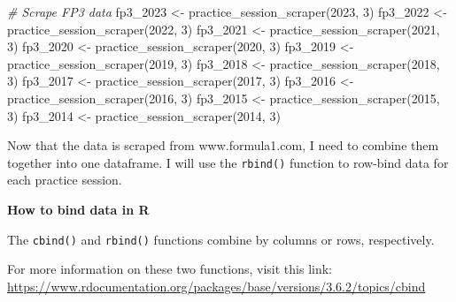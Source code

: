 \documentclass[
]{book}
\newenvironment{Shaded}{\begin{snugshade}}{\end{snugshade}}
\newcommand{\CommentTok}[1]{\textcolor[rgb]{0.56,0.35,0.01}{\textit{#1}}}
\newcommand{\DecValTok}[1]{\textcolor[rgb]{0.00,0.00,0.81}{#1}}
\newcommand{\FunctionTok}[1]{\textcolor[rgb]{0.00,0.00,0.00}{#1}}
\newcommand{\NormalTok}[1]{#1}
\newcommand{\OtherTok}[1]{\textcolor[rgb]{0.56,0.35,0.01}{#1}}
\begin{document}
\begin{Shaded}
\begin{Highlighting}[]
\CommentTok{\# Scrape FP3 data}
\NormalTok{fp3\_2023 }\OtherTok{\textless{}{-}} \FunctionTok{practice\_session\_scraper}\NormalTok{(}\DecValTok{2023}\NormalTok{, }\DecValTok{3}\NormalTok{)}
\NormalTok{fp3\_2022 }\OtherTok{\textless{}{-}} \FunctionTok{practice\_session\_scraper}\NormalTok{(}\DecValTok{2022}\NormalTok{, }\DecValTok{3}\NormalTok{)}
\NormalTok{fp3\_2021 }\OtherTok{\textless{}{-}} \FunctionTok{practice\_session\_scraper}\NormalTok{(}\DecValTok{2021}\NormalTok{, }\DecValTok{3}\NormalTok{)}
\NormalTok{fp3\_2020 }\OtherTok{\textless{}{-}} \FunctionTok{practice\_session\_scraper}\NormalTok{(}\DecValTok{2020}\NormalTok{, }\DecValTok{3}\NormalTok{)}
\NormalTok{fp3\_2019 }\OtherTok{\textless{}{-}} \FunctionTok{practice\_session\_scraper}\NormalTok{(}\DecValTok{2019}\NormalTok{, }\DecValTok{3}\NormalTok{)}
\NormalTok{fp3\_2018 }\OtherTok{\textless{}{-}} \FunctionTok{practice\_session\_scraper}\NormalTok{(}\DecValTok{2018}\NormalTok{, }\DecValTok{3}\NormalTok{)}
\NormalTok{fp3\_2017 }\OtherTok{\textless{}{-}} \FunctionTok{practice\_session\_scraper}\NormalTok{(}\DecValTok{2017}\NormalTok{, }\DecValTok{3}\NormalTok{)}
\NormalTok{fp3\_2016 }\OtherTok{\textless{}{-}} \FunctionTok{practice\_session\_scraper}\NormalTok{(}\DecValTok{2016}\NormalTok{, }\DecValTok{3}\NormalTok{)}
\NormalTok{fp3\_2015 }\OtherTok{\textless{}{-}} \FunctionTok{practice\_session\_scraper}\NormalTok{(}\DecValTok{2015}\NormalTok{, }\DecValTok{3}\NormalTok{)}
\NormalTok{fp3\_2014 }\OtherTok{\textless{}{-}} \FunctionTok{practice\_session\_scraper}\NormalTok{(}\DecValTok{2014}\NormalTok{, }\DecValTok{3}\NormalTok{)}
\end{Highlighting}
\end{Shaded}

Now that the data is scraped from www.formula1.com, I need to combine them together into one dataframe. I will use the \texttt{rbind()} function to row-bind data for each practice session.

\begin{blackbox}

\begin{center}
\textbf{How to bind data in R}

\end{center}

The \texttt{cbind()} and \texttt{rbind()} functions combine by columns or rows, respectively.

For more information on these two functions, visit this link: \url{https://www.rdocumentation.org/packages/base/versions/3.6.2/topics/cbind}

\end{blackbox}
\end{document}
